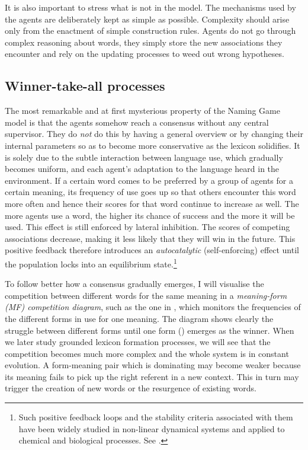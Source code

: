 It is also important to stress what is not in the model. 
The mechanisms used by the agents are deliberately kept as 
simple as possible. Complexity should arise only from the 
enactment of simple construction rules. Agents do not 
go through complex reasoning about words, they simply 
store the new associations they encounter and rely on 
the updating processes to weed out wrong hypotheses. 

\subsection{Winner-take-all processes}

The most remarkable and at first mysterious property of the 
Naming Game model is that the agents somehow reach a consensus
without any central supervisor. They do {\itshape not} do this by 
having a general overview or by changing their internal 
parameters so as to become more conservative as the lexicon
solidifies. It is solely due to the subtle interaction between
language use, which gradually becomes uniform, and each agent's
adaptation to the language heard in the environment. 
If a certain word comes to be preferred by a group of agents
for a certain meaning, its frequency of use goes up so that
others encounter this 
word more often and hence their scores for that word
continue to increase as well.
The more agents use a word, the higher its chance of success
and the more it will be used. This effect is still enforced 
by lateral inhibition. The scores of competing associations 
decrease, making it less likely that they will win in the future. 
This positive feedback therefore introduces an 
{\itshape autocatalytic} (self-enforcing) effect until the population
locks into an equilibrium state.\footnote{
Such positive feedback loops and the stability criteria
associated with them have been widely studied in non-linear
dynamical systems and applied to chemical and biological 
processes. See \cite{Babloyantz:1986}.}

To follow better how a consensus gradually emerges, I will visualise
the competition between different words for the same meaning
in a {\itshape meaning-form (MF) competition diagram}, 
such as the one in , which monitors 
the frequencies of the different forms in use for one meaning.
The diagram shows clearly the struggle between different forms until
one form () emerges as the winner. When we later study 
grounded lexicon formation processes, we will see that the 
competition becomes much more complex and the whole system 
is in constant evolution. A form-meaning pair which is 
dominating may become weaker because its meaning
fails to pick up the right
referent in a new context. 
This in turn may trigger the creation of new words or the 
resurgence of existing words. 

